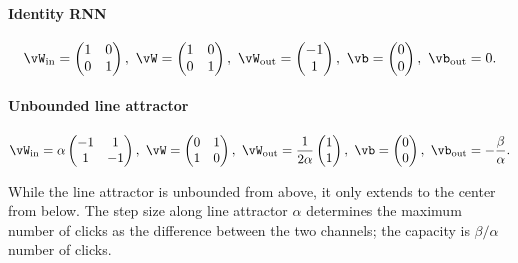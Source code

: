\documentclass{article}
\newcounter{ct}
\newcommand{\win}{\vW_{\text{in}}}
\newcommand{\wout}{\vW_{\text{out}}}
\newcommand{\bout}{\vb_{\text{out}}}
\theoremstyle{definition}
\theoremstyle{remark}
\begin{document}
\paragraph{Identity RNN}
\label{sec:ubpa,sec:iRNN}
\begin{equation}\label{eq:irnn}
\win = 
\begin{pmatrix}
1  &  0 \\
0 &  1
\end{pmatrix}, \
\vW = 
\begin{pmatrix}
1  &  0 \\
0  &  1
\end{pmatrix}, \
\wout = 
\begin{pmatrix}
-1  \\  1 
\end{pmatrix}, \
\vb = 
\begin{pmatrix}
0  \\ 0
\end{pmatrix}, \
\bout = 0.
\end{equation}


\paragraph{Unbounded line attractor}
\label{sec:ubla}
\begin{equation}\label{eq:ubla}
\win = \alpha
\begin{pmatrix}
-1  &  1 \\
1  &  -1
\end{pmatrix}, \
\vW = 
\begin{pmatrix}
0  &  1 \\
1  &  0
\end{pmatrix}, \
\wout = \frac{1}{2\alpha}
\begin{pmatrix}
1  \\  1 
\end{pmatrix}, \
\vb = 
\begin{pmatrix}
0  \\  0
\end{pmatrix}, \
\bout = -\frac{\beta}{\alpha}.
\end{equation}

While the line attractor is unbounded from above, it only extends to the center from below.  The  step size along line attractor $\alpha$ determines the maximum number of clicks as the difference between the two channels; the capacity is $\beta/\alpha$ number of clicks.
\end{document}
